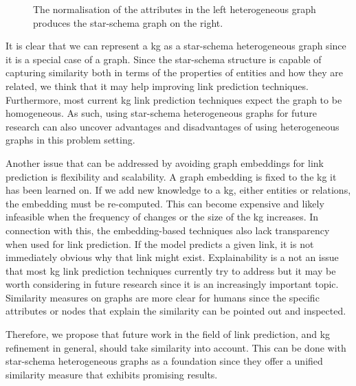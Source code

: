 \begin{figure}[ht]
  \centering\small
  \subfloat[Heterogeneous]{\centering}\qquad
  \caption{The normalisation of the attributes in the left heterogeneous graph produces the star-schema graph on the right.}%
  \label{fig:heterogeneous-star-schema}
\end{figure}

It is clear that we can represent a \ac{kg} as a star-schema heterogeneous graph since it is a special case of a graph.
Since the star-schema structure is capable of capturing similarity both in terms of the properties of entities and how they are related, we think that it may help improving link prediction techniques.
Furthermore, most current \ac{kg} link prediction techniques expect the graph to be homogeneous\cite{Cai2018}.
As such, using star-schema heterogeneous graphs for future research can also uncover advantages and disadvantages of using heterogeneous graphs in this problem setting.

Another issue that can be addressed by avoiding graph embeddings for link prediction is flexibility and scalability.
A graph embedding is fixed to the \ac{kg} it has been learned on.
If we add new knowledge to a \ac{kg}, either entities or relations, the embedding must be re-computed.
This can become expensive and likely infeasible when the frequency of changes or the size of the \ac{kg} increases.
In connection with this, the embedding-based techniques also lack transparency when used for link prediction.
If the model predicts a given link, it is not immediately obvious why that link might exist.
Explainability is a not an issue that most \ac{kg} link prediction techniques currently try to address but it may be worth considering in future research since it is an increasingly important topic\cite{Gilpin2018}.
Similarity measures on graphs are more clear for humans since the specific attributes or nodes that explain the similarity can be pointed out and inspected.

Therefore, we propose that future work in the field of link prediction, and \ac{kg} refinement in general, should take similarity into account.
This can be done with star-schema heterogeneous graphs as a foundation since they offer a unified similarity measure that exhibits promising results.
